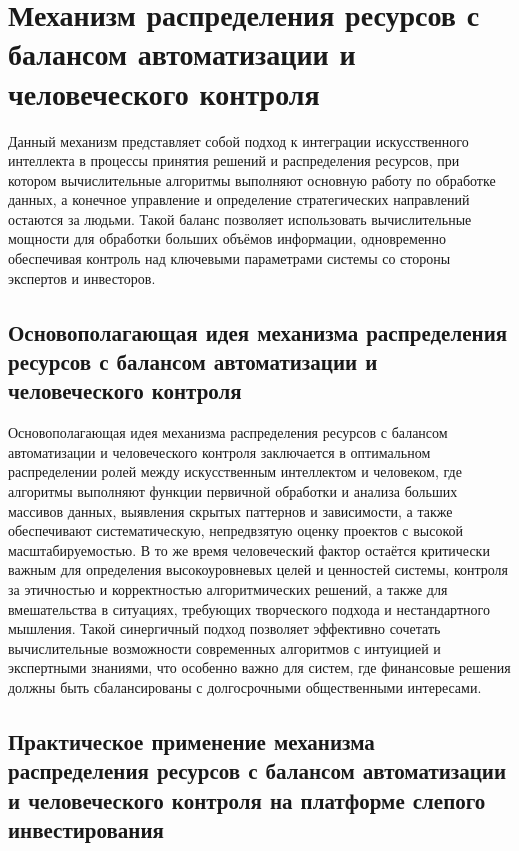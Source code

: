 \documentclass[
    candidate, %
    subf, %
    dotsinheaders=false,
]{disser}
\begin{document}
  \section{Механизм распределения ресурсов с балансом автоматизации и человеческого контроля}

  Данный механизм представляет собой подход к интеграции искусственного интеллекта в процессы принятия решений и распределения ресурсов, при котором вычислительные алгоритмы выполняют основную работу по обработке данных, а конечное управление и определение стратегических направлений остаются за людьми. Такой баланс позволяет использовать вычислительные мощности для обработки больших объёмов информации, одновременно обеспечивая контроль над ключевыми параметрами системы со стороны экспертов и инвесторов.

  \subsection{Основополагающая идея механизма распределения ресурсов с балансом автоматизации и человеческого контроля}

  Основополагающая идея механизма распределения ресурсов с балансом автоматизации и человеческого контроля заключается в оптимальном распределении ролей между искусственным интеллектом и человеком, где алгоритмы выполняют функции первичной обработки и анализа больших массивов данных, выявления скрытых паттернов и зависимости, а также обеспечивают систематическую, непредвзятую оценку проектов с высокой масштабируемостью. В то же время человеческий фактор остаётся критически важным для определения высокоуровневых целей и ценностей системы, контроля за этичностью и корректностью алгоритмических решений, а также для вмешательства в ситуациях, требующих творческого подхода и нестандартного мышления. Такой синергичный подход позволяет эффективно сочетать вычислительные возможности современных алгоритмов с интуицией и экспертными знаниями, что особенно важно для систем, где финансовые решения должны быть сбалансированы с долгосрочными общественными интересами.

  \subsection{Практическое применение механизма распределения ресурсов с балансом автоматизации и человеческого контроля на платформе слепого инвестирования}
\end{document}
